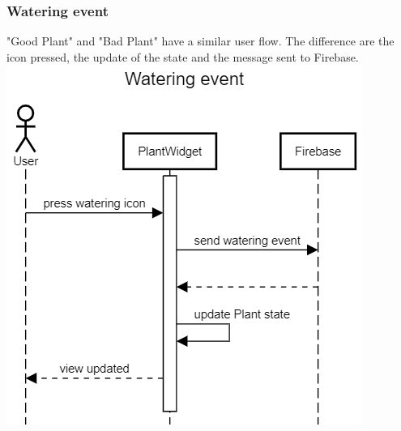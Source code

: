 \documentclass[10pt]{article}
\begin{document}
	\subsubsection{Watering event}
	"Good Plant" and "Bad Plant" have a similar user flow. The difference are the icon pressed, the update of the state and the message sent to Firebase.
	\newline
	\newline
	\newline
	\includegraphics[scale=0.40]{resources/WateringEvent.png}
	\newpage
\end{document}
